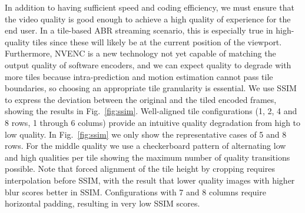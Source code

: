 
In addition to having sufficient speed and coding efficiency, we must ensure that the video quality is good enough to achieve a high quality of experience for the end user.
In a tile-based ABR streaming scenario, this is especially true in high-quality tiles since these will likely be at the current position of the viewport.
Furthermore, NVENC is a new technology not yet capable of matching the output quality of software encoders, and we can expect quality to degrade with more tiles because intra-prediction and motion estimation cannot pass tile boundaries, so choosing an appropriate tile granularity is essential.
We use SSIM to express the deviation between the original and the tiled encoded frames, showing the results in Fig.~\ref{fig:ssim}.
Well-aligned tile configurations (1, 2, 4 and 8 rows, 1 through 6 colums) provide an intuitive quality degradation from high to low quality. In Fig.~\ref{fig:ssim} we only show the representative cases of 5 and 8 rows. For the middle quality we use a checkerboard pattern of alternating low and high qualities per tile showing the maximum number of quality transitions possible. Note that forced alignment of the tile height by cropping requires interpolation before SSIM, with the result that lower quality images with higher blur scores better in SSIM. Configurations with 7 and 8 columns require horizontal padding, resulting in very low SSIM scores.

